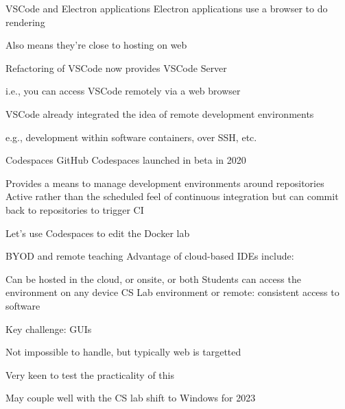 \documentclass[aspectratio=169,t]{beamer}
\begin{document}
\begin{dframe}{VSCode and Electron applications}
  \1 Electron applications use a browser to do rendering
  
  \2 Also means they're close to hosting on web

  \bigskip

  \1 Refactoring of VSCode now provides VSCode Server
  
  \2 i.e., you can access VSCode remotely via a web browser
  
  \bigskip

  \1 VSCode already integrated the idea of remote development environments

  \2 e.g., development within software containers, over SSH, etc.
\end{dframe}

\begin{dframe}{Codespaces}
  \1 GitHub Codespaces launched in beta in 2020 %

  \2 Provides a means to manage development environments around repositories
  \2 Active rather than the scheduled feel of continuous integration
  \2 but can commit back to repositories to trigger CI

  \bigskip

  \1 Let's use Codespaces to edit the Docker lab
\end{dframe}

\begin{dframe}{BYOD and remote teaching}
  \1 Advantage of cloud-based IDEs include:
  
  \2 Can be hosted in the cloud, or onsite, or both
  \2 Students can access the environment on any device
  \2 CS Lab environment or remote: consistent access to software

  \1 Key challenge: GUIs
  
  \2 Not impossible to handle, but typically web is targetted

  \1 Very keen to test the practicality of this
  
  \2 May couple well with the CS lab shift to Windows for 2023
\end{dframe}
\end{document}
